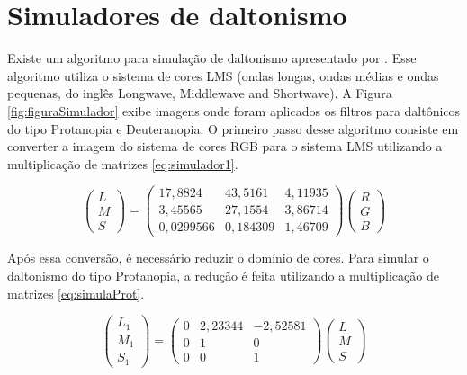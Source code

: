 \documentclass[	12pt, Times, openright, twoside, a4paper, english, brazil]{abntex2}
\begin{document}
\section{Simuladores de daltonismo}

Existe um algoritmo para simulação de daltonismo apresentado por . Esse algoritmo utiliza o sistema de cores LMS (ondas longas, ondas médias e ondas pequenas, do inglês Longwave, Middlewave and Shortwave). A Figura \ref{fig:figuraSimulador} exibe imagens onde foram aplicados os filtros para daltônicos do tipo Protanopia e Deuteranopia. O primeiro passo desse algoritmo consiste em converter a imagem do sistema de cores RGB para o sistema LMS utilizando a multiplicação de matrizes \ref{eq:simulador1}.

\begin{equation}
\left(\begin{array}{ccc}
L\\M\\S
\end{array}\right)
=
\left(\begin{array}{ccc}
17,8824 & 43,5161 & 4,11935 \\
3,45565 & 27,1554 & 3,86714 \\
0,0299566 & 0,184309 & 1,46709
\end{array}\right)
\left(\begin{array}{ccc}
R\\G\\B
\end{array}\right)
\label{eq:simulador1}
\end{equation}

Após essa conversão, é necessário reduzir o domínio de cores. Para simular o daltonismo do tipo Protanopia, a redução é feita utilizando a multiplicação de matrizes \ref{eq:simulaProt}.

\begin{equation}
\left(\begin{array}{ccc}
L_1\\M_1\\S_1
\end{array}\right)
=
\left(\begin{array}{ccc}
0 & 2,23344 & -2,52581 \\
0 & 1 & 0 \\
0 & 0 & 1
\end{array}\right)
\left(\begin{array}{ccc}
L\\M\\S
\end{array}\right)
\label{eq:simulaProt}
\end{equation}
\end{document}
